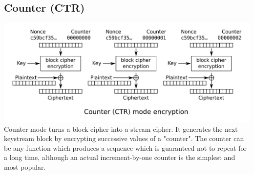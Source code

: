 \documentclass[10pt,a4paper]{article}
\begin{document}
\subsection{Counter (CTR)}
\includegraphics[scale=0.2]{img/CTR.png}
\newline 
Counter mode turns a block cipher into a stream cipher. It generates the next keystream block by encrypting successive values of a "counter". The counter can be any function which produces a sequence which is guaranteed not to repeat for a long time, although an actual increment-by-one counter is the simplest and most popular.
\end{document}
